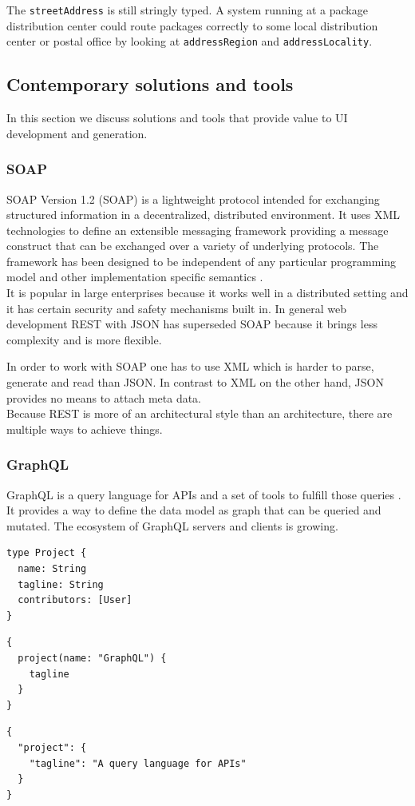 The \lstinline{streetAddress} is still stringly typed. A system running at a package distribution center could route packages correctly to some local distribution center or postal office by looking at \lstinline{addressRegion} and \lstinline{addressLocality}.

\subsection{Contemporary solutions and tools}
In this section we discuss solutions and tools that provide value to UI development and generation.

\subsubsection{SOAP}
SOAP Version 1.2 (SOAP) is a lightweight protocol intended for exchanging structured information in a decentralized, distributed environment. It uses XML technologies to define an extensible messaging framework providing a message construct that can be exchanged over a variety of underlying protocols. The framework has been designed to be independent of any particular programming model and other implementation specific semantics \citep{soap}. \\
It is popular in large enterprises because it works well in a distributed setting and it has certain security and safety mechanisms built in. In general web development REST with JSON has superseded SOAP because it brings less complexity and is more flexible.

In order to work with SOAP one has to use XML  which is harder to parse, generate and read than JSON. In contrast to XML on the other hand, JSON provides no means to attach meta data. \\
Because REST is more of an architectural style than an architecture, there are multiple ways to achieve things.

\subsubsection{GraphQL}\label{graphql}
GraphQL is a query language for APIs and a set of tools to fulfill those queries \citep{graphql}. It provides a way to define the data model as graph that can be queried and mutated. The ecosystem of GraphQL servers and clients is growing.

\lstset{language=GraphQL}
\begin{lstlisting}[caption=Simple data model in the GraphQL data description language.]
type Project {
  name: String
  tagline: String
  contributors: [User]
}
\end{lstlisting}
\lstset{language=GraphQL}
\begin{lstlisting}[caption=Example of a GraphQL query to fetch the tagline of a certain project.]
{
  project(name: "GraphQL") {
    tagline
  }
}
\end{lstlisting}
\lstset{language=JSON}
\begin{lstlisting}[caption=Response of the GraphQL server in JSON.]
{
  "project": {
    "tagline": "A query language for APIs"
  }
}\end{lstlisting}

